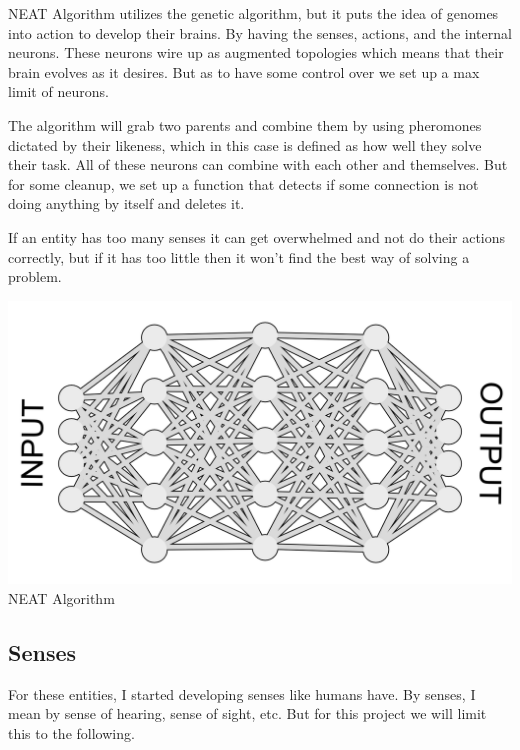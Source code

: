 \documentclass[10pt, letterpaper]{article}
\begin{document}
\begin{Form}
    NEAT Algorithm \parencite{NeatAlgorithm} utilizes the genetic algorithm, but it puts the idea of genomes into action to develop their brains.
	By having the senses, actions, and the internal neurons. These neurons wire up as augmented topologies which
	means that their brain evolves as it desires. But as to have some control over we set up a max limit of neurons.

	The algorithm will grab two parents and combine them by using pheromones dictated by their likeness, which in this
	case is defined as how well they solve their task. All of these neurons can combine with each other and themselves.
	But for some cleanup, we set up a function that detects if some connection is not doing anything by itself and deletes it.

	If an entity has too many senses it can get overwhelmed and not do their actions correctly, but if it has too little
	then it won't find the best way of solving a problem.

    \begin{center}
        \includegraphics[scale=0.15]{IMG/NeatAlgorithm.png} \\
        NEAT Algorithm
    \end{center}

	\subsection{Senses}

	For these entities, I started developing senses like humans have. By senses, I mean by sense of hearing, sense of sight, etc.
	But for this project we will limit this to the following.


\end{Form}
\end{document}
